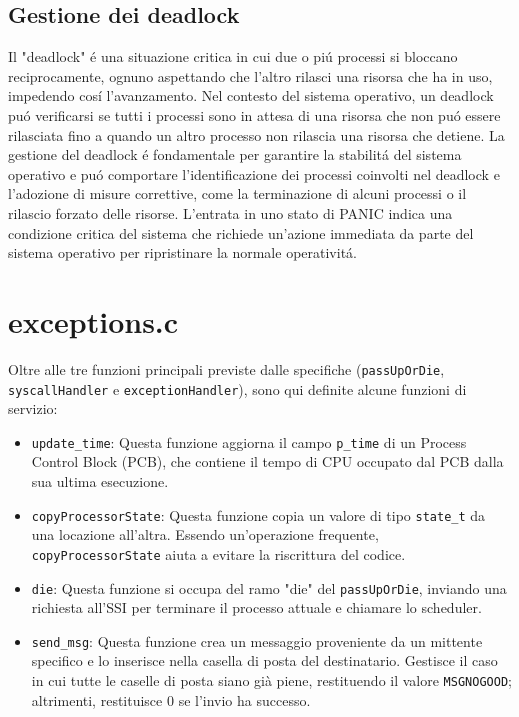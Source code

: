 \documentclass[a4paper]{article}
\begin{document}
\subsection{Gestione dei deadlock}
Il "deadlock" \'e una situazione critica in cui due o pi\'u processi si bloccano reciprocamente, ognuno aspettando che l'altro rilasci una risorsa che ha in uso, impedendo cos\'i l'avanzamento. Nel contesto del sistema operativo, un deadlock pu\'o verificarsi se tutti i processi sono in attesa di una risorsa che non pu\'o essere rilasciata fino a quando un altro processo non rilascia una risorsa che detiene. La gestione del deadlock \'e fondamentale per garantire la stabilit\'a del sistema operativo e pu\'o comportare l'identificazione dei processi coinvolti nel deadlock e l'adozione di misure correttive, come la terminazione di alcuni processi o il rilascio forzato delle risorse. L'entrata in uno stato di PANIC indica una condizione critica del sistema che richiede un'azione immediata da parte del sistema operativo per ripristinare la normale operativit\'a.



\section{exceptions.c}
Oltre alle tre funzioni principali previste dalle specifiche (\verb+passUpOrDie+, \verb+syscallHandler+ e \verb+exceptionHandler+), sono qui definite alcune funzioni di servizio:

\begin{itemize}
\item \verb+update_time+: Questa funzione aggiorna il campo \verb+p_time+ di un Process Control Block (PCB), che contiene il tempo di CPU occupato dal PCB dalla sua ultima esecuzione.
\item \verb+copyProcessorState+: Questa funzione copia un valore di tipo \verb+state_t+ da una locazione all'altra. Essendo un'operazione frequente, \verb+copyProcessorState+ aiuta a evitare la riscrittura del codice.
\item \verb+die+: Questa funzione si occupa del ramo "die" del \verb+passUpOrDie+, inviando una richiesta all'SSI per terminare il processo attuale e chiamare lo scheduler.
\item \verb+send_msg+: Questa funzione crea un messaggio proveniente da un mittente specifico e lo inserisce nella casella di posta del destinatario. Gestisce il caso in cui tutte le caselle di posta siano già piene, restituendo il valore \verb+MSGNOGOOD+; altrimenti, restituisce 0 se l'invio ha successo.
\end{itemize}
\end{document}
